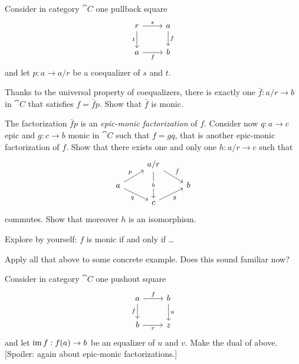
\begin{exercise}
  Consider in category \(\cat C\) one pullback square
  \[\begin{tikzcd}
      r \ar["s", r] \ar["t", d, swap] & a \ar["f", d] \\
      a \ar["f", r, swap] & b
    \end{tikzcd}\] and let \(p : a \to {a}{/}{r}\) be a coequalizer of
  \(s\) and \(t\).
  \begin{tcbenum}
  \item Thanks to the universal property of coequalizers, there is
    exactly one \(\bar f : {a}{/}{r} \to b\) in \(\cat C\) that
    satisfies \(f = \bar f p\). Show that \(\bar f\) is monic.
  \item The factorization \(\bar f p\) is an {\em epic-monic
      factorization} of \(f\). Consider now \(q : a \to c\) epic and
    \(g : c \to b\) monic in \(\cat C\) such that \(f = gq\), that is
    another epic-monic factorization of \(f\). Show that there exists
    one and only one \(h : {a}{/}{r} \to c\) such that
    \[\begin{tikzcd}[row sep=small]
        & {a}{/}{r} \ar["h" description, dd] \ar["{\bar f}", dr] & \\
        a \ar["p", ur] \ar["q", dr, swap] & & b \\
        & c \ar["g", ur, swap]
      \end{tikzcd}\] commutes. Show that moreover \(h\) is an
    isomorphism.
  \item Explore by yourself: \(f\) is monic if and only if \dots{}
  \item Apply all that above to some concrete example. Does this sound
    familiar now?
  \end{tcbenum}
  Consider in category \(\cat C\) one pushout square
  \[\begin{tikzcd}
      a \ar["f", r] \ar["f", d, swap] & b \ar["u", d] \\
      b \ar["v", r, swap] & z
    \end{tikzcd}\] and let \(\operatorname{im} f : f(a) \to b\) be an equalizer of
  \(u\) and \(v\). Make the dual of above. [Spoiler: again about
  epic-monic factorizations.]
\end{exercise}

\begin{exercise}
  \YetToBeTeXed
\end{exercise}

